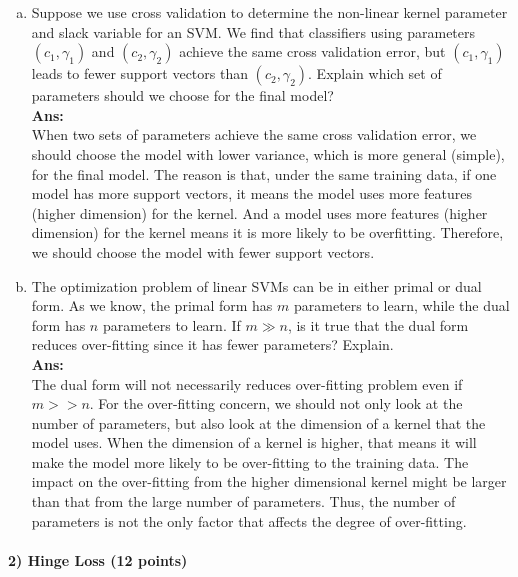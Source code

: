 \documentclass[11pt]{article}
\begin{document}
\begin{enumerate}[(a)]
\item Suppose we use cross validation to determine the non-linear kernel parameter and slack variable for an SVM. We find that classifiers using parameters $(c_1,\gamma_1)$ and $(c_2,\gamma_2)$ achieve the same cross validation error, but $(c_1,\gamma_1)$ leads to fewer support vectors than $(c_2,\gamma_2)$. Explain which set of parameters should we choose for the final model?\\
\textbf{Ans:}\\
When two sets of parameters achieve the same cross validation error, we should choose the model with lower variance, which is more general (simple), for the final model. The reason is that, under the same training data, if one model has more support vectors, it means the model uses more features (higher dimension) for the kernel. And a model uses more features (higher dimension) for the kernel means it is more likely to be overfitting. Therefore, we should choose the model with fewer support vectors.

\item The optimization problem of linear SVMs can be in either primal or dual form. As we know, the primal form has $m$ parameters to learn, while the dual form has $n$ parameters to learn. If $m \gg n$, is it true that the dual form reduces over-fitting since it has fewer parameters? Explain.\\
\textbf{Ans:}\\
The dual form will not necessarily reduces over-fitting problem even if $m >> n$. For the over-fitting concern, we should not only look at the number of parameters, but also look at the dimension of a kernel that the model uses. When the dimension of a kernel is higher, that means it will make the model more likely to be over-fitting to the training data. The impact on the over-fitting from the higher dimensional kernel might be larger than that from the large number of parameters. Thus, the number of parameters is not the only factor that affects the degree of over-fitting.

\end{enumerate}

\paragraph{2) Hinge Loss (12 points)}
\end{document}
